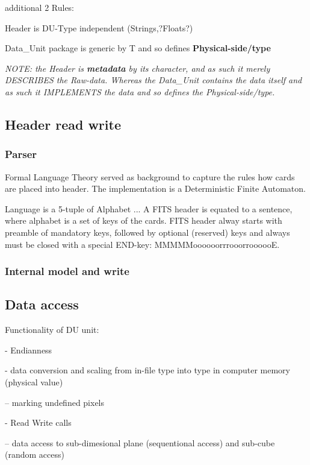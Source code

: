 \documentclass[a4paper,10pt]{article}
\begin{document}
additional 2 Rules:

Header is DU-Type independent (Strings,?Floats?)

Data\_Unit package is generic by T and so defines \textbf{Physical-side/type}

\textit{NOTE: the Header is \textbf{metadata} by its character, and as such it merely DESCRIBES the Raw-data.
Whereas the Data\_Unit contains the data itself and as such it IMPLEMENTS the data and so defines
the Physical-side/type.}


\subsection{Header read write}

\subsubsection{Parser}

Formal Language Theory served as background to capture the rules how cards are placed 
into header. The implementation is a Deterministic Finite Automaton.

Language is a 5-tuple of Alphabet ...
A FITS header is equated to a sentence, where alphabet is a set of keys of the cards.
FITS header alway starts with preamble of mandatory keys, followed by optional (reserved) keys
and always must be closed with a special END-key: MMMMMoooooorrrooorroooooE.


\subsubsection{Internal model and write}



\subsection{Data access}

Functionality of DU unit:

- Endianness

- data conversion and scaling from in-file type into type in computer memory (physical value)

-- marking undefined pixels

- Read Write calls

-- data access to sub-dimesional plane (sequentional access) and sub-cube (random access)
\end{document}
